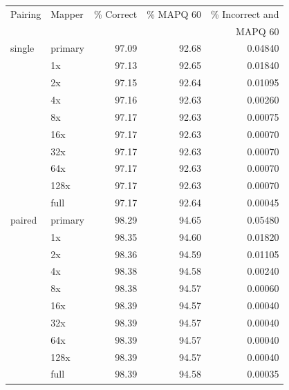 \documentclass[11pt]{ucscthesis}
\begin{document}
\begin{table}[H]
    \centering
    \begin{tabular}{|l|l|r|r|r|}
    \hline
        Pairing & Mapper & \% Correct & \% MAPQ 60 & \% Incorrect and \\
               &         &            &            & MAPQ 60          \\
        \hline
        single  & primary	& 97.09     & 92.68     & 0.04840 \\
                & 1x	    & 97.13     & 92.65     & 0.01840 \\
                & 2x	    & 97.15     & 92.64     & 0.01095 \\
                & 4x	    & 97.16     & 92.63     & 0.00260 \\
                & 8x	    & 97.17     & 92.63     & 0.00075 \\
                & 16x	    & 97.17     & 92.63     & 0.00070 \\
                & 32x	    & 97.17     & 92.63     & 0.00070 \\
                & 64x   	& 97.17     & 92.63     & 0.00070 \\
                & 128x	    & 97.17     & 92.63     & 0.00070 \\
                & full  	& 97.17     & 92.64     & 0.00045 \\

                
                

        \hline
        paired  & primary	& 98.29     & 94.65     & 0.05480 \\
                & 1x	    & 98.35     & 94.60     & 0.01820 \\
                & 2x	    & 98.36     & 94.59     & 0.01105 \\
                & 4x	    & 98.38     & 94.58     & 0.00240 \\
                & 8x	    & 98.38     & 94.57     & 0.00060 \\
                & 16x	    & 98.39     & 94.57     & 0.00040 \\
                & 32x	    & 98.39     & 94.57     & 0.00040 \\
                & 64x	    & 98.39     & 94.57     & 0.00040 \\
                & 128x	    & 98.39     & 94.57     & 0.00040 \\
                & full  	& 98.39     & 94.58     & 0.00035 \\
                


\end{tabular}
\end{table}
\end{document}
